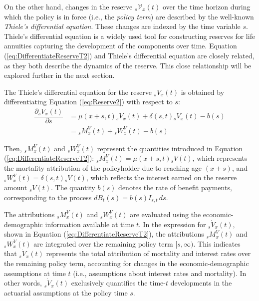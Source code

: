 \documentclass[12pt]{article}
\begin{document}
On the other hand, changes in the reserve \( {}_s\mathcal{V}_x(t) \) over the time horizon during which the policy is in force (i.e., the \textit{policy term}) are described by the well-known \textit{Thiele's differential equation}. These changes are indexed by the time variable \( s \). Thiele's differential equation is a widely used tool for constructing reserves for life annuities capturing the development of the components over time. Equation (\ref{eq:DifferentiateReserveT2}) and Thiele's differential equation are closely related, as they both describe the dynamics of the reserve. This close relationship will be explored further in the next section.

The Thiele's differential equation for the reserve \( {}_sV_x(t) \) is obtained by differentiating Equation (\ref{eq:Reserve2}) with respect to \( s \):
\begin{equation}\label{eq:Thiele}
	\begin{split}
		\dfrac{\partial {}_sV_x(t)}{\partial s}&= \mu(x+s,t){}_sV_x(t) + \delta(s,t){}_sV_x(t) - b(s) \\
		&= {}_sM^V_x(t) + {}_sW^V_x(t) - b(s)
	\end{split}
\end{equation}

Then, ${}_sM^V_x(t)$ and ${}_sW^V_x(t)$ represent the quantities introduced in Equation (\ref{eq:DifferentiateReserveT2}): ${}_sM^V_x(t) = \mu(x+s,t){}_sV(t)$, which represents the mortality attribution of the policyholder due to reaching age \( (x+s) \), and ${}_sW^V_x(t) = \delta(s,t){}_sV(t)$, which reflects the interest earned on the reserve amount ${}_sV(t)$. The quantity \( b(s) \) denotes the rate of benefit payments, corresponding to the process \( dB_t(s) = b(s) I_{s,t} \, ds \).

The attributions ${}_sM^V_x(t)$ and ${}_sW^V_x(t)$ are evaluated using the economic-demographic information available at time \( t \). In the expression for ${}_s\dot{V}_x(t)$, shown in Equation (\ref{eq:DifferentiateReserveT2}), the attributions ${}_sM^V_x(t)$ and ${}_sW^V_x(t)$ are integrated over the remaining policy term \( [s, \infty) \). This indicates that ${}_s\dot{V}_x(t)$ represents the total attribution of mortality and interest rates over the remaining policy term, accounting for changes in the economic-demographic assumptions at time \( t \) (i.e., assumptions about interest rates and mortality). In other words, ${}_s\dot{V}_x(t)$ exclusively quantifies the time-\( t \) developments in the actuarial assumptions at the policy time \( s \).
\end{document}
